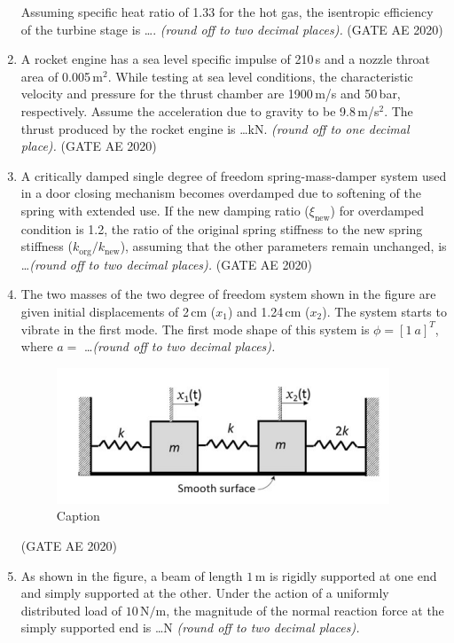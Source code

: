 \documentclass[journal,12pt,onecolumn]{IEEEtran}
\theoremstyle{remark}
\begin{document}
\begin{enumerate}
Assuming specific heat ratio of 1.33 for the hot gas, the isentropic efficiency of the turbine stage is \dots. \textit{(round off to two decimal places).}
\hfill(GATE AE 2020)

\item A rocket engine has a sea level specific impulse of 210\,s and a nozzle throat area of 0.005\,m$^2$. While testing at sea level conditions, the characteristic velocity and pressure for the thrust chamber are 1900\,m/s and 50\,bar, respectively. Assume the acceleration due to gravity to be 9.8\,m/s$^2$. The thrust produced by the rocket engine is \dots kN. \textit{(round off to one decimal place).}
\hfill(GATE AE 2020)

\item A critically damped single degree of freedom spring-mass-damper system used in a door closing mechanism becomes overdamped due to softening of the spring with extended use. If the new damping ratio ($\xi_\text{new}$) for overdamped condition is 1.2, the ratio of the original spring stiffness to the new spring stiffness ($k_\text{org} / k_\text{new}$), assuming that the other parameters remain unchanged, is \dots \textit{(round off to two decimal places).}
\hfill(GATE AE 2020)

\item The two masses of the two degree of freedom system shown in the figure are given initial displacements of 2\,cm ($x_1$) and 1.24\,cm ($x_2$). The system starts to vibrate in the first mode. The first mode shape of this system is $\phi = [1~a]^T$, where $a =$ \dots \textit{(round off to two decimal places).}

\begin{figure}[H]
    \centering
    \includegraphics[width=0.5\columnwidth]{figs/Screenshot from 2025-08-19 16-16-27.png}
    \caption{Caption}
    \label{fig:placeholder}
\end{figure}
\hfill(GATE AE 2020)

\item As shown in the figure, a beam of length $1\,\mathrm{m}$ is rigidly supported at one end and simply supported at the other. Under the action of a uniformly distributed load of $10\,\mathrm{N/m}$, the magnitude of the normal reaction force at the simply supported end is \dots $\mathrm{N}$ \textit{(round off to two decimal places).}


\end{enumerate}
\end{document}
